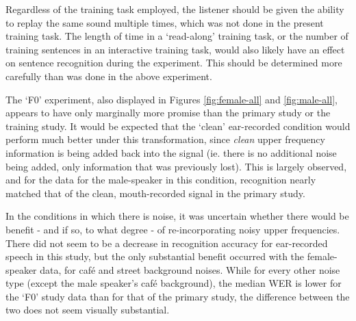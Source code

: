 Regardless of the training task employed, the listener should be given the ability to replay the same sound multiple times, which was not done in the present training task.  The length of time in a `read-along' training task, or the number of training sentences in an interactive training task, would also likely have an effect on sentence recognition during the experiment.  This should be determined more carefully than was done in the above experiment.

% 


The `F0' experiment, also displayed in Figures \ref{fig:female-all} and \ref{fig:male-all}, appears to have only marginally more promise than the primary study or the training study.  It would be expected that the `clean' ear-recorded condition would perform much better under this transformation, since \textit{clean} upper frequency information is being added back into the signal (ie. there is no additional noise being added, only information that was previously lost).  This is largely observed, and for the data for the male-speaker in this condition, recognition nearly matched that of the clean, mouth-recorded signal in the primary study.

In the conditions in which there is noise, it was uncertain whether there would be benefit - and if so, to what degree - of re-incorporating noisy upper frequencies.  There did not seem to be a decrease in recognition accuracy for ear-recorded speech in this study, but the only substantial benefit occurred with the female-speaker data, for caf\'{e} and street background noises.  While for every other noise type (except the male speaker's caf\'{e} background), the median WER is lower for the `F0' study data than for that of the primary study, the difference between the two does not seem visually substantial.


